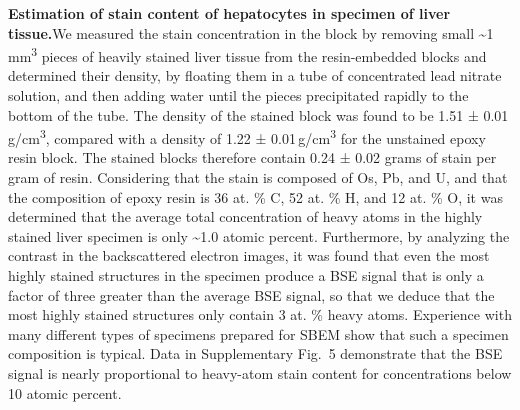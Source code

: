 \documentclass{article}
\begin{document}
\medskip
\noindent\textbf{Estimation of stain content of hepatocytes in specimen of liver tissue.}\quad We measured the stain concentration in the block by removing small \textasciitilde1\,mm\textsuperscript{3} pieces of heavily stained liver tissue from the resin-embedded blocks and determined their density, by floating them in a tube of concentrated lead nitrate solution, and then adding water until the pieces precipitated rapidly to the bottom of the tube. The density of the stained block was found to be 1.51 ± 0.01\,g/cm\textsuperscript{3}, compared with a density of 1.22 ± 0.01\,g/cm\textsuperscript{3} for the unstained epoxy resin block. The stained blocks therefore contain 0.24 ± 0.02 grams of stain per gram of resin. Considering that the stain is composed of Os, Pb, and U, and that the composition of epoxy resin is 36 at. \% C, 52 at. \% H, and 12 at. \% O, it was determined that the average total concentration of heavy atoms in the highly stained liver specimen is only \textasciitilde1.0 atomic percent. Furthermore, by analyzing the contrast in the backscattered electron images, it was found that even the most highly stained structures in the specimen produce a BSE signal that is only a factor of three greater than the average BSE signal, so that we deduce that the most highly stained structures only contain 3 at. \% heavy atoms. Experience with many different types of specimens prepared for SBEM show that such a specimen composition is typical. Data in Supplementary Fig.~5 demonstrate that the BSE signal is nearly proportional to heavy-atom stain content for concentrations below 10 atomic percent.
\end{document}
